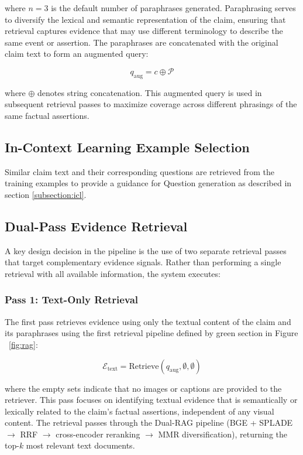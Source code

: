 where $n = 3$ is the default number of paraphrases generated. Paraphrasing serves to diversify the lexical and semantic representation of the claim, ensuring that retrieval captures evidence that may use different terminology to describe the same event or assertion. The paraphrases are concatenated with the original claim text to form an augmented query:

\begin{equation}
    q_{\text{aug}} = c \oplus \mathcal{P}
\end{equation}

where $\oplus$ denotes string concatenation. This augmented query is used in subsequent retrieval passes to maximize coverage across different phrasings of the same factual assertions.

\subsection{In-Context Learning Example Selection}
Similar claim text and their corresponding questions are retrieved from the training examples to provide a guidance for Question generation as described in section \ref{subsection:icl}.


\subsection{Dual-Pass Evidence Retrieval}

A key design decision in the pipeline is the use of two separate retrieval passes that target complementary evidence signals. Rather than performing a single retrieval with all available information, the system executes:

\subsubsection{Pass 1: Text-Only Retrieval}

The first pass retrieves evidence using only the textual content of the claim and its paraphrases using the first retrieval pipeline defined by green section in Figure ~\ref{fig:rag}:

\begin{equation}
    \mathcal{E}_{\text{text}} = \text{Retrieve}(q_{\text{aug}}, \emptyset, \emptyset)
\end{equation}

where the empty sets indicate that no images or captions are provided to the retriever. This pass focuses on identifying textual evidence that is semantically or lexically related to the claim's factual assertions, independent of any visual content. The retrieval passes through the Dual-RAG pipeline (BGE + SPLADE $\rightarrow$ RRF $\rightarrow$ cross-encoder reranking $\rightarrow$ MMR diversification), returning the top-$k$ most relevant text documents.

